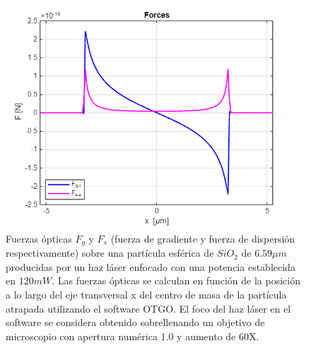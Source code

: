 \documentclass[10pt,aspectratio=1610,compress,dvipsnames]{beamer}
\begin{document}
\begin{frame}
{\begin{figure}
    \centering
    \includegraphics[scale=0.35]{Screenshot 2025-03-05 004832.png}
    \caption{Fuerzas ópticas $F_g$ y $F_s$ (fuerza de gradiente y fuerza de dispersión respectivamente) sobre una partícula esférica de $SiO_2$ de $6.59 \mu m$ producidas por un haz láser enfocado con una potencia establecida en $120 mW$. Las fuerzas ópticas se calculan en función de la posición a lo largo del eje transversal x del centro de masa de la partícula atrapada utilizando el software OTGO. El foco del haz láser en el software se considera obtenido sobrellenando un objetivo de microscopio con apertura numérica 1.0 y aumento de 60X.}
    \label{OpticalforcessetupKaren}
\end{figure} 

}





\end{frame}
\end{document}
